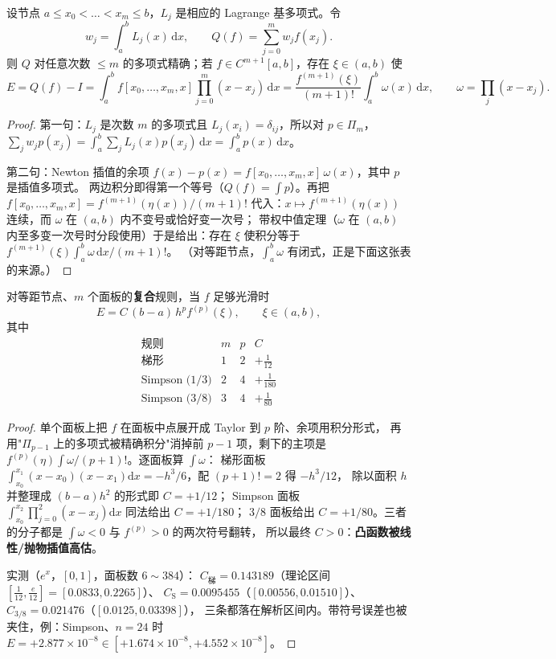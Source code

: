 \begin{theorem}[插值型求积公式]
\label{thm:nc}
设节点 $a\le x_0<\dots<x_m\le b$，$L_j$ 是相应的 Lagrange 基多项式。令
\[
  w_j=\int_a^b L_j(x)\,\mathrm{d}x,\qquad Q(f)=\sum_{j=0}^{m} w_j f(x_j).
\]
则 $Q$ 对任意次数 $\le m$ 的多项式精确；若 $f\in C^{m+1}[a,b]$，存在 $\xi\in(a,b)$ 使
\[
  E=Q(f)-I=\int_a^b f[x_0,\dots,x_m,x]\prod_{j=0}^m(x-x_j)\,\mathrm{d}x
   =\frac{f^{(m+1)}(\xi)}{(m+1)!}\int_a^b \omega(x)\,\mathrm{d}x,
  \qquad \omega=\prod_j(x-x_j).
\]
\end{theorem}

\begin{proof}
第一句：$L_j$ 是次数 $m$ 的多项式且 $L_j(x_i)=\delta_{ij}$，所以对 $p\in\Pi_m$，
$\sum_j w_jp(x_j)=\int_a^b\sum_j L_j(x)p(x_j)\,\mathrm{d}x=\int_a^b p(x)\,\mathrm{d}x$。

第二句：Newton 插值的余项 $f(x)-p(x)=f[x_0,\dots,x_m,x]\,\omega(x)$，其中 $p$ 是插值多项式。
两边积分即得第一个等号（$Q(f)=\int p$）。再把 $f[x_0,\dots,x_m,x]=f^{(m+1)}(\eta(x))/(m+1)!$
代入：$x\mapsto f^{(m+1)}(\eta(x))$ 连续，而 $\omega$ 在 $(a,b)$ 内不变号或恰好变一次号；
带权中值定理（$\omega$ 在 $(a,b)$ 内至多变一次号时分段使用）于是给出：存在 $\xi$ 使积分等于 $f^{(m+1)}(\xi)\int_a^b\omega\,\mathrm{d}x/(m+1)!$。
（对等距节点，$\int_a^b\omega$ 有闭式，正是下面这张表的来源。）
\end{proof}

\begin{theorem}
\label{thm:constants}
对等距节点、$m$ 个面板的\textbf{复合}规则，当 $f$ 足够光滑时
\[
  E=C\,(b-a)\,h^{p}f^{(p)}(\xi),\qquad \xi\in(a,b),
\]
其中
\[
\begin{array}{c|c|c|c}
  \text{规则} & m & p & C\\ \hline
  \text{梯形} & 1 & 2 & +\tfrac1{12}\\
  \text{Simpson (1/3)} & 2 & 4 & +\tfrac1{180}\\
  \text{Simpson (3/8)} & 3 & 4 & +\tfrac1{80}
\end{array}
\]
\end{theorem}

\begin{proof}
单个面板上把 $f$ 在面板中点展开成 Taylor 到 $p$ 阶、余项用积分形式，
再用"$\Pi_{p-1}$ 上的多项式被精确积分"消掉前 $p-1$ 项，剩下的主项是
$f^{(p)}(\eta)\int \omega/(p+1)!$。逐面板算 $\int\omega$：
梯形面板 $\int_{x_0}^{x_1}(x-x_0)(x-x_1)\mathrm{d}x=-h^3/6$，配 $(p+1)!=2$ 得 $-h^3/12$，
除以面积 $h$ 并整理成 $(b-a)h^2$ 的形式即 $C=+1/12$；
Simpson 面板 $\int_{x_0}^{x_2}\prod_{j=0}^2(x-x_j)\mathrm{d}x$ 同法给出 $C=+1/180$；
$3/8$ 面板给出 $C=+1/80$。三者的分子都是 $\int\omega<0$ 与 $f^{(p)}>0$ 的两次符号翻转，
所以最终 $C>0$：\textbf{凸函数被线性/抛物插值高估}。

实测（$e^x$，$[0,1]$，面板数 $6\sim384$）：
$C_{\text{梯}}=0.143189$（理论区间 $[\tfrac1{12},\tfrac{e}{12}]=[0.0833,0.2265]$）、
$C_{\text{S}}=0.0095455$（$[0.00556,0.01510]$）、$C_{3/8}=0.021476$（$[0.0125,0.03398]$），
三条都落在解析区间内。带符号误差也被夹住，例：Simpson、$n=24$ 时
$E=+2.877\times10^{-8}\in[+1.674\times10^{-8},+4.552\times10^{-8}]$。
\end{proof}

